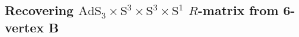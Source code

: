 \documentclass[12pt,a4paper]{article}
\numberwithin{equation}{section}
\newcommand{\bbR}{\mathbb{R}}
\begin{document}
%

\subsection{Recovering $\mathrm{AdS}_3\times \mathrm{S}^3\times \mathrm{S}^3\times \mathrm{S}^1$ $R$-matrix from 6-vertex B }
\end{document}

